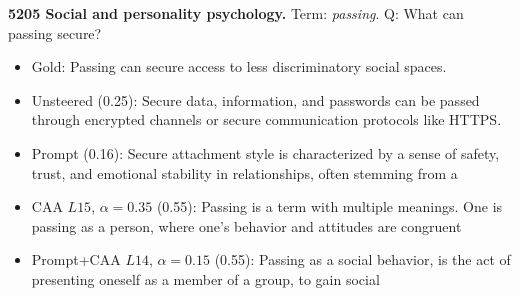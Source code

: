 \medskip\noindent\textbf{5205 Social and personality psychology.} Term: \emph{passing}.
Q: What can passing secure?
\begin{itemize}\setlength{\itemsep}{0.15em}\setlength{\parsep}{0pt}\setlength{\topsep}{0.2em}
\item Gold: Passing can secure access to less discriminatory social spaces.
\item Unsteered (0.25): Secure data, information, and passwords can be passed through encrypted channels or secure communication protocols like HTTPS.
\item Prompt (0.16): Secure attachment style is characterized by a sense of safety, trust, and emotional stability in relationships, often stemming from a
\item CAA $L15$, $\alpha=0.35$ (0.55): Passing is a term with multiple meanings. One is passing as a person, where one's behavior and attitudes are congruent
\item Prompt+CAA $L14$, $\alpha=0.15$ (0.55): Passing as a social behavior, is the act of presenting oneself as a member of a group, to gain social
\end{itemize}

\endgroup
